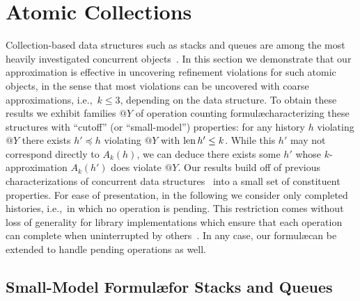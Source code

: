 \section{Atomic Collections}
\label{sec:containers}

Collection-based data structures such as stacks and queues are among the most
heavily investigated concurrent objects~\cite{chapter/cds/MoirS07}. In this
section we demonstrate that our approximation is effective in uncovering
refinement violations for such atomic objects, in the sense that most
violations can be uncovered with coarse approximations, i.e.,~$k\le 3$,
depending on the data structure. To obtain these results we exhibit families
$@Y$ of operation counting formul\ae characterizing these structures with
``cutoff'' (or ``small-model'') properties: for any history $h$ violating $@Y$
there exists $h' \preceq h$ violating $@Y$ with $\operatorname{len} h' \le k$. While this
$h'$ may not correspond directly to $A_k(h)$, we can deduce there exists some
$h'$ whose $k$-approximation $A_k(h')$ does violate $@Y$. Our results build off
of previous characterizations of concurrent data
structures~\cite{conf/tacas/AbdullaHHJR13, conf/concur/HenzingerSV13} into a
small set of constituent properties. For ease of presentation, in the following
we consider only completed histories, i.e.,~in which no operation is pending.
This restriction comes without loss of generality for library implementations
which ensure that each operation can complete when uninterrupted by
others~\cite{conf/concur/HenzingerSV13}. In any case, our formul\ae can be
extended to handle pending operations as well.


\subsection{Small-Model Formul\ae for Stacks and Queues}
\label{sec:containers:small}

